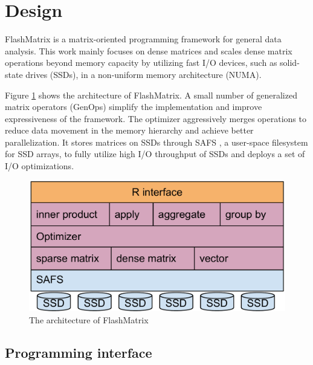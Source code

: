 \section{Design}

FlashMatrix is a matrix-oriented programming framework for general data analysis.
This work mainly focuses on dense matrices and scales dense matrix operations
beyond memory capacity by utilizing fast I/O devices, such as solid-state drives
(SSDs), in a non-uniform memory architecture (NUMA).

Figure \ref{fig:arch} shows the architecture of FlashMatrix. 
A small number of generalized matrix operators (GenOps)
 simplify the implementation and improve expressiveness of
the framework. The optimizer aggressively merges operations to
reduce data movement in the memory hierarchy and achieve better parallelization.
It stores matrices on SSDs through SAFS \cite{safs},
a user-space filesystem for SSD arrays, to fully utilize high I/O
throughput of SSDs and deploys a set of I/O optimizations.

\begin{figure}
\centering
\includegraphics[scale=0.3]{FlashMatrix_figs/architecture.pdf}
\caption{The architecture of FlashMatrix}
\label{fig:arch}
\end{figure}

\subsection{Programming interface}

